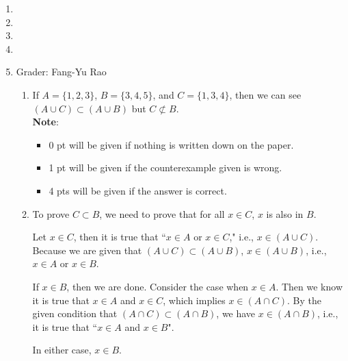 \documentclass[12pt,letter]{article}
\title{}
\begin{document}

\begin{enumerate}

\item 

\item 

\item

\item 

\item Grader: Fang-Yu Rao
	\begin{enumerate}
	\item If $A = \{1, 2, 3\}$, $B = \{3, 4, 5\}$, and $C = \{ 1, 3, 4\}$, then 
	we can see $(A \cup C) \subset (A \cup B)$ but 
	$C \not\subset B$.\\
	{\bf Note}:
	\begin{itemize}
	\item 0 pt will be given if nothing is written down on the paper.\\
	\item 1 pt will be given if the counterexample given is wrong.\\
	\item 4 pts will be given if the answer is correct.
	\end{itemize}

	\item To prove $C \subset B$, we need to prove that 
	for all $x \in C$, $x$ is also in $B$.
	\par
	Let $x \in C$, then it is true that ``$x \in A$ or $x \in C$," i.e., $x \in (A \cup C)$.
	Because we are given that $(A \cup C) \subset (A \cup B)$, 
	$x \in (A \cup B)$, i.e., $x \in A$ or $x \in B$.

	\par
	If $x \in B$, then we are done.
	Consider the case when $x \in A$. 
	Then we know it is true that
	$x \in A$ and $x \in C$, which implies $x \in (A \cap C)$.
	By the given condition that $(A \cap C) \subset (A \cap B)$, 
	we have $x \in (A \cap B)$, i.e., it is true that 
	``$x \in A$ and $x \in B$".

	\par
	In either case, $x \in B$.


\end{enumerate}
\end{enumerate}
\end{document}
